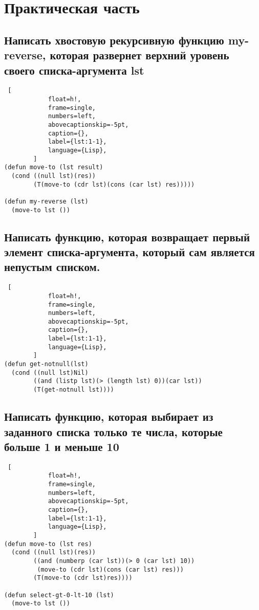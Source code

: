 \chapter{Практическая часть}

    \section{Написать хвостовую рекурсивную функцию my-reverse, которая развернет верхний уровень своего списка-аргумента lst}
    
        \begin{lstlisting} [
        	float=h!,
        	frame=single,
        	numbers=left,
        	abovecaptionskip=-5pt,
        	caption={},
        	label={lst:1-1},
        	language={Lisp},
        ]
(defun move-to (lst result)
  (cond ((null lst)(res))
        (T(move-to (cdr lst)(cons (car lst) res)))))

(defun my-reverse (lst)
  (move-to lst ())
        \end{lstlisting}

    \section{Написать функцию, которая возвращает первый элемент списка-аргумента, который сам является непустым списком.}
    
        \begin{lstlisting} [
        	float=h!,
        	frame=single,
        	numbers=left,
        	abovecaptionskip=-5pt,
        	caption={},
        	label={lst:1-1},
        	language={Lisp},
        ]
(defun get-notnull(lst)
  (cond ((null lst)Nil)
        ((and (listp lst)(> (length lst) 0))(car lst))
        (T(get-notnull lst))))
        \end{lstlisting}

    \section{Написать функцию, которая выбирает из заданного списка только те числа, которые больше 1 и меньше 10}
    
        \begin{lstlisting} [
        	float=h!,
        	frame=single,
        	numbers=left,
        	abovecaptionskip=-5pt,
        	caption={},
        	label={lst:1-1},
        	language={Lisp},
        ]
(defun move-to (lst res)
  (cond ((null lst)(res))
        ((and (numberp (car lst))(> 0 (car lst) 10))
         (move-to (cdr lst)(cons (car lst) res)))
        (T(move-to (cdr lst)res))))

(defun select-gt-0-lt-10 (lst)
  (move-to lst ())
        \end{lstlisting}

